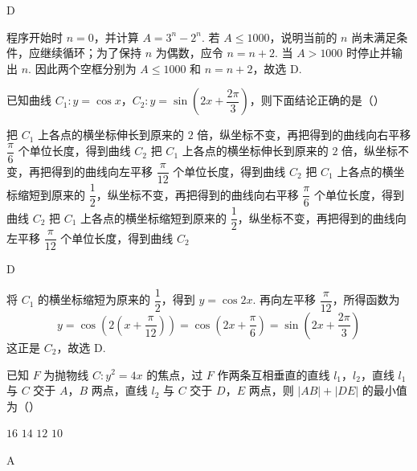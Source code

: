 \begin{answer}
D
\end{answer}

\begin{solution}
程序开始时 \(n=0\)，并计算 \(A=3^n-2^n\). 若 \(A\le1000\)，说明当前的 \(n\) 尚未满足条件，应继续循环；为了保持 \(n\) 为偶数，应令 \(n=n+2\). 当 \(A>1000\) 时停止并输出 \(n\). 因此两个空框分别为 \(A\le1000\) 和 \(n=n+2\)，故选 D.
\end{solution}

\begin{problem}
已知曲线 \(C_1:y=\cos x\)，\(C_2:y=\sin\left(2x+\dfrac{2\pi}{3}\right)\)，则下面结论正确的是（\quad）

\choices
    {把 \(C_1\) 上各点的横坐标伸长到原来的 \(2\) 倍，纵坐标不变，再把得到的曲线向右平移 \(\dfrac{\pi}{6}\) 个单位长度，得到曲线 \(C_2\)}
    {把 \(C_1\) 上各点的横坐标伸长到原来的 \(2\) 倍，纵坐标不变，再把得到的曲线向左平移 \(\dfrac{\pi}{12}\) 个单位长度，得到曲线 \(C_2\)}
    {把 \(C_1\) 上各点的横坐标缩短到原来的 \(\dfrac12\)，纵坐标不变，再把得到的曲线向右平移 \(\dfrac{\pi}{6}\) 个单位长度，得到曲线 \(C_2\)}
    {把 \(C_1\) 上各点的横坐标缩短到原来的 \(\dfrac12\)，纵坐标不变，再把得到的曲线向左平移 \(\dfrac{\pi}{12}\) 个单位长度，得到曲线 \(C_2\)}
\end{problem}

\begin{answer}
D
\end{answer}

\begin{solution}
将 \(C_1\) 的横坐标缩短为原来的 \(\dfrac12\)，得到 \(y=\cos2x\). 再向左平移 \(\dfrac\pi{12}\)，所得函数为
\[
y=\cos\left(2\left(x+\frac\pi{12}\right)\right)=\cos\left(2x+\frac\pi6\right)=\sin\left(2x+\frac{2\pi}{3}\right)
\]
这正是 \(C_2\)，故选 D.
\end{solution}

\begin{problem}
已知 \(F\) 为抛物线 \(C:y^2=4x\) 的焦点，过 \(F\) 作两条互相垂直的直线 \(l_1\)，\(l_2\)，直线 \(l_1\) 与 \(C\) 交于 \(A\)，\(B\) 两点，直线 \(l_2\) 与 \(C\) 交于 \(D\)，\(E\) 两点，则 \(\lvert AB\rvert+\lvert DE\rvert\) 的最小值为（\quad）

\choices
    {\(16\)}
    {\(14\)}
    {\(12\)}
    {\(10\)}
\end{problem}

\begin{answer}
A
\end{answer}

